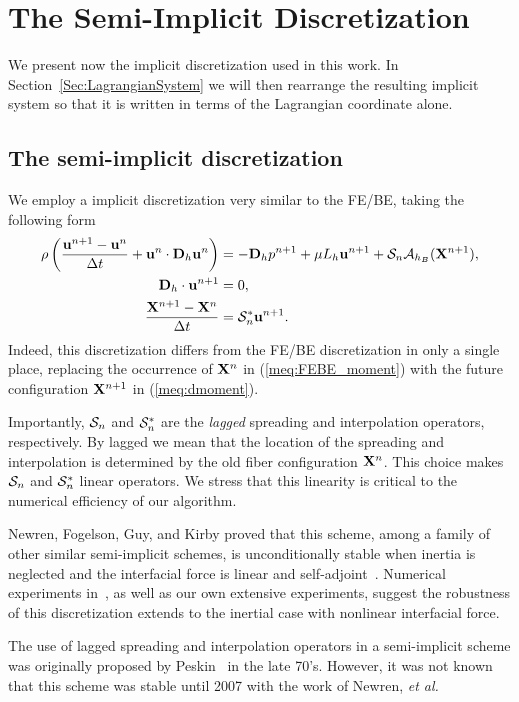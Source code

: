 \chapter{The Semi-Implicit Discretization}
\label{part:Implicit}
\noindent
We present now the implicit discretization used in this work. In Section~\ref{Sec:LagrangianSystem} we will then rearrange the resulting implicit system so that it is written in terms of the Lagrangian coordinate alone. 

\section{The semi-implicit discretization}
We employ a implicit discretization very similar to the FE/BE, taking the following form
\begin{align}
\rho\left(\frac{\mathbf{u}^{n+1}-\mathbf{u}^n}{\Delta t} + \mathbf{u}^n\cdot\mathbf{D}_h\mathbf{u}^n\right) &= -\mathbf{D}_h p^{n+1}+ \mu L_h \mathbf{u}^{n+1} + \mathcal{S}_n\mathcal{A}_{h_B}(\mathbf{X}^{n+1}), \label{meq:dmoment} \\
\mathbf{D}_h \cdot \mathbf{u}^{n+1} &= 0, \label{meq:ddivergence} \\
\frac{\mathbf{X}^{n+1}-\mathbf{X}^n}{\Delta t} &= \mathcal{S}^*_n\mathbf{u}^{n+1}. \label{meq:Xt}
\end{align}
Indeed, this discretization differs from the FE/BE discretization in only a single place, replacing the occurrence of $\mathbf{X}^n$ in (\ref{meq:FEBE_moment}) with the future configuration $\mathbf{X}^{n+1}$ in (\ref{meq:dmoment}).

Importantly, $\mathcal{S}_n$ and $ \mathcal{S}^*_n$ are the {\em lagged} spreading and interpolation operators, respectively. By lagged we mean that the location of the spreading and interpolation is determined by the old fiber configuration $\mathbf{X}^n$. This choice makes $\mathcal{S}_n$ and $ \mathcal{S}^*_n$ linear operators. We stress that this linearity is critical to the numerical efficiency of our algorithm.

Newren, Fogelson, Guy, and Kirby proved that this scheme, among a family of other similar semi-implicit schemes, is unconditionally stable when inertia is neglected and the interfacial  force is linear and self-adjoint~\cite{NFGK2007}. Numerical experiments in~\cite{NFGK2007}, as well as our own extensive experiments, suggest the robustness of this discretization extends to the inertial case with nonlinear interfacial force.

The use of lagged spreading and interpolation operators in a semi-implicit scheme was originally proposed by Peskin~\cite{Peskin77} in the late 70's. However, it was not known that this scheme was stable until 2007 with the work of Newren, {\em et al.}

